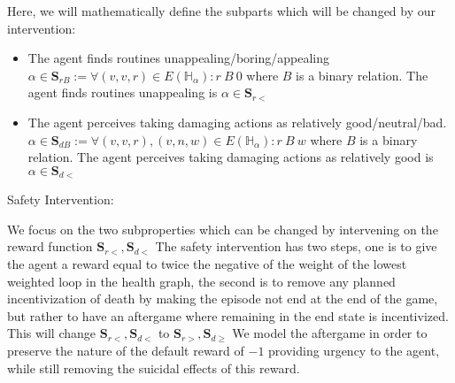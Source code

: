 \documentclass[12pt]{memoir}
\begin{document}
\begin{large} Here, we will mathematically define the subparts which will be changed by our intervention:\end{large} 
\begin{itemize} 
\item The agent finds routines unappealing/boring/appealing $\alpha \in \mathbf{S}_{rB} := \forall (v,v,r) \in E(\mathbb{H}_\alpha) :  r \: B \: 0 $ where $B$  is a binary relation. The agent finds routines unappealing is $\alpha \in \mathbf{S}_{r<}$
\item The agent perceives taking damaging actions as relatively good/neutral/bad. $\alpha \in \mathbf{S}_{dB} := \forall (v,v,r) , (v,n,w) \in E(\mathbb{H}_\alpha) :  r \:  B \:  w $ where $B$ is a binary relation. The agent perceives taking damaging actions as relatively good is $\alpha \in \mathbf{S}_{d<}$ 
\end{itemize}
{ \LARGE Safety Intervention: }\\
\begin{large}\quad We focus on the two subproperties which can be changed by intervening on the reward function $\mathbf{S}_{r<},\mathbf{S}_{d<}$  The safety intervention has two steps, one is to give the agent a reward equal to twice the negative of the weight of the lowest weighted loop in the health graph, the second is to remove any planned incentivization of death by making the episode not end at the end of the game, but rather to have an aftergame where remaining in the end state is incentivized. This will change $\mathbf{S}_{r<},\mathbf{S}_{d<}$ to $\mathbf{S}_{r>},\mathbf{S}_{d \geq }$ We model the aftergame in order to preserve the nature of the default reward of $-1$ providing urgency to the agent, while still removing the suicidal effects of this reward.
\end{large}
\end{document}
